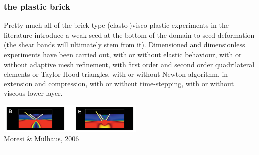 \subsubsection{the plastic brick}

\Literature \cite{hans03,moml07,lemm08,kaus10,egat10,qurj09,mishin11,maie12,spmw16,gltf18,frbt19,aspectmanual}

Pretty much all of the brick-type (elasto-)visco-plastic experiments in the literature
introduce a weak seed at the bottom of the domain to seed deformation (the shear bands
will ultimately stem from it). 
Dimensioned and dimensionless experiments have been carried out, with or without 
elastic behaviour, with or without adaptive mesh refinement, with first order and 
second order quadrilateral elements or Taylor-Hood triangles, with or without 
Newton algorithm, in extension and compression, with or without time-stepping,
with or without viscous lower layer. 


\begin{center}
\includegraphics[width=7cm]{images/benchmark_brick/momu06}\\
{\captionfont Moresi \& M{\"u}lhaus, 2006 \cite{momu06}}
\end{center}

\begin{center}\noindent\rule{8cm}{0.4pt}\end{center}

